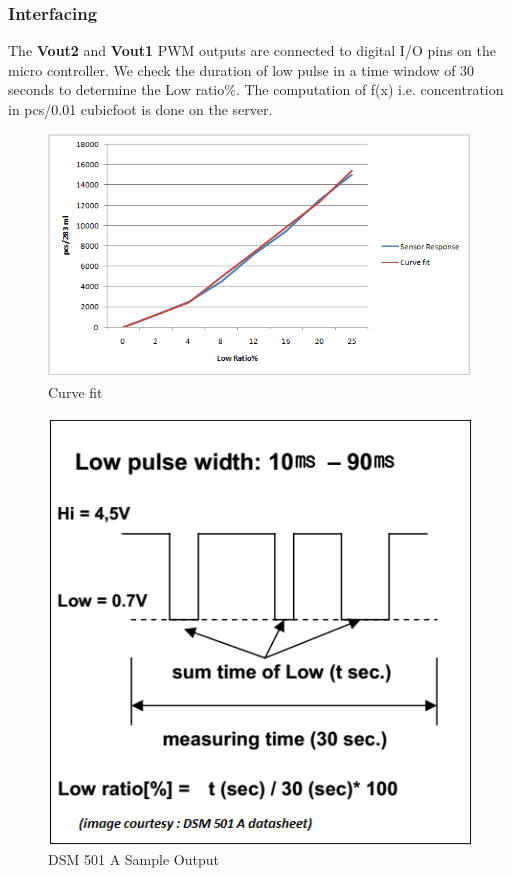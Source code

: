 \documentclass[a4paper,12pt]{article}
\begin{document}
\subsubsection{Interfacing}
The \textbf{Vout2} and \textbf{Vout1} PWM outputs are connected to digital I/O pins on the micro controller. We check the duration of low pulse in a time window of 30 seconds to determine the Low ratio\%. The computation of f(x) i.e. concentration in pcs/0.01 cubicfoot is done on the server.

\begin{figure}[!ht]
\centering
\includegraphics[scale=0.5]{dsm_3.png}
\caption{Curve fit}
\label{fig:temp3}
\end{figure}

\begin{figure}[!ht]
\centering
\includegraphics[scale=0.5]{dsm_1.png}
\caption{DSM 501 A Sample Output}
\label{fig:temp2}
\end{figure}
\end{document}

